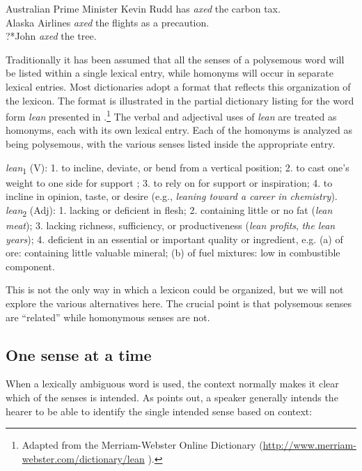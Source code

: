 \ea \label{ex:5.14}
\ea Australian Prime Minister Kevin Rudd has \textit{axed} the carbon tax.\\
\ex Alaska Airlines \textit{axed} the flights as a precaution.\\
\ex ?*John \textit{axed} the tree.
\z \z


Traditionally it has been assumed that all the senses of a polysemous word will be listed within a single lexical entry, while homonyms will occur in separate lexical entries. Most dictionaries adopt a format that reflects this organization of the lexicon. The format is illustrated in the partial dictionary listing for the word form \textit{lean} presented in .\footnote{Adapted from the Merriam-Webster Online Dictionary (\url{http://www.merriam-webster.com/dictionary/lean} ).} The verbal and adjectival uses of \textit{lean} are treated as homonyms, each with its own lexical entry. Each of the homonyms is analyzed as being polysemous, with the various senses listed inside the appropriate entry.


\ea \label{ex:5.15}
\textit{lean}\textsubscript{1} (V): 1. to incline, deviate, or bend from a vertical position; 2. to cast one’s weight to one side for support ; 3. to rely on for support or inspiration; 4. to incline in opinion, taste, or desire (e.g., \textit{leaning toward a career in chemistry}).\\[1.25\baselineskip]

\textit{lean}\textsubscript{2} (Adj): 1. lacking or deficient in flesh; 2. containing little or no fat (\textit{lean meat}); 3. lacking richness, sufficiency, or productiveness (\textit{lean profits}, \textit{the lean years}); 4. deficient in an essential or important quality or ingredient, e.g. (a) of ore: containing little valuable mineral; (b) of fuel mixtures: low in combustible component.
\z


This is not the only way in which a lexicon could be organized, but we will not explore the various alternatives here. The crucial point is that polysemous senses are “related” while homonymous senses are not.


\subsection{One sense at a time}\label{sec:5.3.4}

When a lexically ambiguous word is used, the context normally makes it clear which of the senses is intended. As \citet[53]{Cruse1986} points out, a speaker generally intends the hearer to be able to identify the single intended sense based on context:

